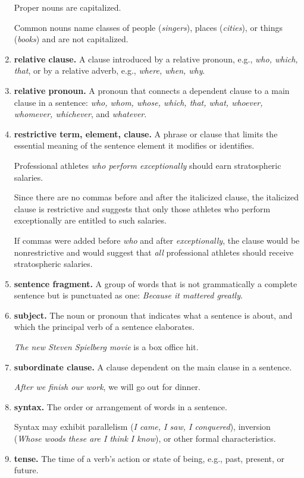 \documentclass{article}
\begin{document}
\begin{enumerate}
	Proper nouns are capitalized.
	
	Common nouns name classes of people ({\it singers}), places ({\it cities}), or things ({\it books}) and are not capitalized.
	\item {\bf relative clause.} A clause introduced by a relative pronoun, e.g., {\it who, which, that}, or by a relative adverb, e.g., {\it where, when, why}.
	\item {\bf relative pronoun.} A pronoun that connects a dependent clause to a main clause in a sentence: {\it who, whom, whose, which, that, what, whoever, whomever, whichever}, and {\it whatever}.
	\item {\bf restrictive term, element, clause.} A phrase or clause that limits the essential meaning of the sentence element it modifies or identifies.
	
	Professional athletes {\it who perform exceptionally} should earn stratospheric salaries.
	
	Since there are no commas before and after the italicized clause, the italicized clause is restrictive and suggests that only those athletes who perform exceptionally are entitled to such salaries.
	
	If commas were added before {\it who} and after {\it exceptionally}, the clause would be nonrestrictive and would suggest that {\it all} professional athletes should receive stratospheric salaries.
	\item {\bf sentence fragment.} A group of words that is not grammatically a complete sentence but is punctuated as one: {\it Because it mattered greatly}.
	\item {\bf subject.} The noun or pronoun that indicates what a sentence is about, and which the principal verb of a sentence elaborates.
	
	{\it The new Steven Spielberg movie} is a box office hit.
	\item {\bf subordinate clause.} A clause dependent on the main clause in a sentence.
	
	{\it After we finish our work}, we will go out for dinner.
	\item {\bf syntax.} The order or arrangement of words in a sentence.
	
	Syntax may exhibit parallelism ({\it I came, I saw, I conquered}), inversion ({\it Whose woods these are I think I know}), or other formal characteristics.
	\item {\bf tense.} The time of a verb's action or state of being, e.g., past, present, or future.
	

\end{enumerate}
\end{document}
